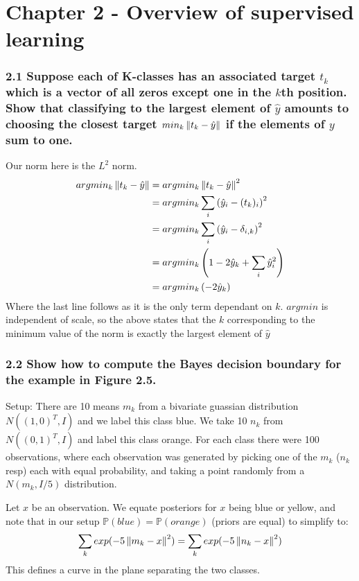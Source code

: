 
\chapter{Chapter 2 - Overview of supervised learning}

\subsection*{2.1 Suppose each of K-classes has an associated target $t_k$ which is a vector of all zeros except one in the $k$th position. Show that classifying to the largest element of $\hat{y}$ amounts to choosing the closest target $min_k \left\lVert t_k - \hat{y}\right\rVert$ if the elements of $y$ sum to one.}

Our norm here is the $L^2$ norm. 
\begin{align*}
    argmin_k \left\lVert t_k - \hat{y}\right\rVert &=  argmin_k \left\lVert t_k - \hat{y}\right\rVert^2 \\
    &= argmin_k \sum_i \left(\hat{y}_i - (t_k)_i\right)^2 \\
    &= argmin_k \sum_i \left(\hat{y}_i - \delta_{i, k}\right)^2 \\
    &= argmin_k \left( 1 - 2 \hat{y}_k + \sum_i  \hat{y}_i^2\right)  \\
    &= argmin_k \left(-2\hat{y}_k\right)
\end{align*}
Where the last line follows as it is the only term dependant on $k$. $argmin$ is independent of scale, so the above states that the $k$ corresponding to the minimum value of the norm is exactly the largest element of $\hat{y}$


\subsection*{2.2 Show how to compute the Bayes decision boundary for the example in Figure 2.5.}
Setup: There are 10 means $m_k$ from a bivariate guassian distribution $N((1,0)^T, I)$ and we label this class blue.
We take 10 $n_k$ from $N((0,1)^T, I)$ and label this class orange.
For each class there were 100 observations, where each observation was generated by picking one of the $m_k$ ($n_k$ resp) each with equal probability, and taking a point randomly from a $N(m_k, I/5)$ distribution.

Let $x$ be an observation. We equate posteriors for $x$ being blue or yellow, and note that in our setup $\mathbb{P}(blue) = \mathbb{P}(orange)$ (priors are equal) to simplify to:
$$\sum_k exp(-5 \left\lVert m_k - x\right\rVert^2) = \sum_k exp(-5 \left\lVert n_k - x\right\rVert^2)$$
This defines a curve in the plane separating the two classes.


